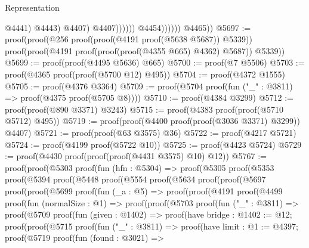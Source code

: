 \begin{lexlean}{Representation}
\begin{coremodule}
                                              @4441)
                                            @4443)
                                          @4407)
                                        @4407))))))
                        @4454))))))
        @4465))
@5697 := proof(proof(@256 proof(proof(@4191 proof(@5638 @5687)) @5339))
      proof(proof(@4191 proof(proof(proof(@4355 @665) @4362) @5687)) @5339))
@5699 := proof(proof(@4495 @5636) @665)
@5700 := proof(@7 @5506)
@5703 := proof(@4365 proof(proof(@5700 @12) @495))
@5704 := proof(@4372 @1555)
@5705 := proof(@4376 @3364)
@5709 := proof(@5704 proof(fun ("_" : @3811) => proof(@4375 proof(@5705 @8))))
@5710 := proof(@4384 @3299)
@5712 := proof(proof(@890 @3371) @3243)
@5715 := proof(@4383 proof(proof(@5710 @5712) @495))
@5719 := proof(proof(@4400 proof(proof(@3036 @3371) @3299)) @4407)
@5721 := proof(proof(@63 @3575) @36)
@5722 := proof(@4217 @5721)
@5724 := proof(@4199 proof(@5722 @10))
@5725 := proof(@4423 @5724)
@5729 := proof(@4430 proof(proof(proof(@4431 @3575) @10) @12))
@5767 := proof(proof(@5303
        proof(fun (hfn : @5304) =>
          proof(@5305
              proof(@5353
                  proof(@5394
                      proof(@5448
                          proof(@5554
                              proof(@5634
                                  proof(proof(@5697
                                        proof(proof(@5699
                                              proof(fun (_a : @5) =>
                                                proof(proof(@4191
                                                      proof(@4499
                                                          proof(fun (normalSize : @1) =>
                                                            proof(proof(@5703
                                                                  proof(fun ("_" : @3811) =>
                                                                    proof(@5709
                                                                        proof(fun (given : @1402) =>
                                                                          proof(have bridge : @1402 := @12;
                                                                            proof(proof(@5715
                                                                                  proof(fun ("_" : @3811) =>
                                                                                    proof(have limit : @1 := @4397;
                                                                                      proof(@5719
                                                                                          proof(fun (found : @3021) =>

\end{coremodule}
\end{lexlean}
